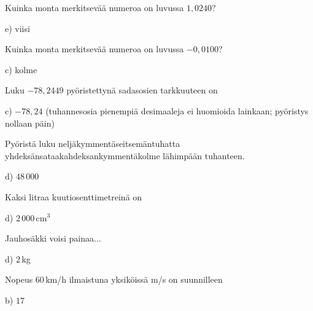 \begin{tehtava}
Kuinka monta merkitsevää numeroa on luvussa $1,0240$?
\begin{vastaus}
e) viisi
\end{vastaus}
\end{tehtava}

\begin{tehtava}
Kuinka monta merkitsevää numeroa on luvussa $-0,0100$?
\begin{vastaus}
c) kolme
\end{vastaus}
\end{tehtava}

\begin{tehtava}
Luku $-78,2449$ pyöristettynä sadasosien tarkkuuteen on
\begin{vastaus}
c) $-78,24$ (tuhannesosia pienempiä desimaaleja ei huomioida lainkaan; pyöristys nollaan päin)
\end{vastaus}
\end{tehtava}

\begin{tehtava}
Pyöristä luku neljäkymmentäseitsemäntuhatta yhdeksänsataakahdeksankymmentäkolme lähimpään tuhanteen.
\begin{vastaus}
d) $48\,000$
\end{vastaus}
\end{tehtava}

\begin{tehtava}
Kaksi litraa kuutiosenttimetreinä on	
	\begin{vastaus}
	d) $2\,000$\,cm$^3$
	\end{vastaus}
\end{tehtava}

\begin{tehtava}
Jauhosäkki voisi painaa...
	\begin{vastaus}
	d) $2$\,kg
	\end{vastaus}
\end{tehtava}

\begin{tehtava}
Nopeus $60$\,km/h ilmaistuna yksiköissä m/s on suunnilleen
	\begin{vastaus}
	b) $17$
	\end{vastaus}
\end{tehtava}

